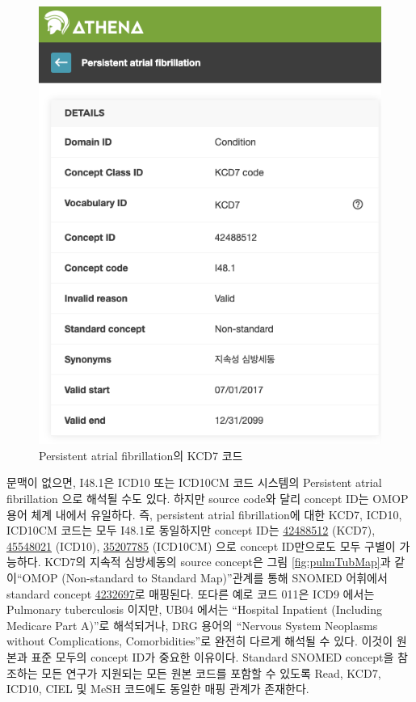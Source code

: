 \documentclass[10.5pt]{book}
\theoremstyle{definition}
\theoremstyle{definition}
\theoremstyle{definition}
\theoremstyle{remark}
\begin{document}
\begin{figure}

{\centering \includegraphics[width=0.75\linewidth]{images/CommonDataModel/AFKCD7} 

}

\caption{Persistent atrial fibrillation의 KCD7 코드}\label{fig:pulmTubICD9}
\end{figure}

문맥이 없으면, I48.1은 ICD10 또는 ICD10CM 코드 시스템의 Persistent
atrial fibrillation 으로 해석될 수도 있다. 하지만 source code와 달리
concept ID는 OMOP 용어 체계 내에서 유일하다. 즉, persistent atrial
fibrillation에 대한 KCD7, ICD10, ICD10CM 코드는 모두 I48.1로 동일하지만
concept ID는
\href{http://athena.ohdsi.org/search-terms/terms/42488512}{42488512}
(KCD7),
\href{http://athena.ohdsi.org/search-terms/terms/45548021}{45548021}
(ICD10),
\href{http://athena.ohdsi.org/search-terms/terms/35207785}{35207785}
(ICD10CM) 으로 concept ID만으로도 모두 구별이 가능하다. KCD7의 지속적
심방세동의 source concept은 그림 \ref{fig:pulmTubMap}과 같이``OMOP
(Non-standard to Standard Map)''관계를 통해 SNOMED 어휘에서 standard
concept
\href{http://athena.ohdsi.org/search-terms/terms/4232697}{4232697}로
매핑된다. 또다른 예로 코드 011은 ICD9 에서는 Pulmonary tuberculosis
이지만, UB04 에서는 ``Hospital Inpatient (Including Medicare Part A)''로
해석되거나, DRG 용어의 ``Nervous System Neoplasms without Complications,
Comorbidities''로 완전히 다르게 해석될 수 있다. 이것이 원본과 표준
모두의 concept ID가 중요한 이유이다. Standard SNOMED concept을 참조하는
모든 연구가 지원되는 모든 원본 코드를 포함할 수 있도록 Read, KCD7,
ICD10, CIEL 및 MeSH 코드에도 동일한 매핑 관계가 존재한다.
\end{document}
